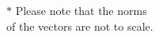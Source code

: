\documentclass[preview]{standalone}
\begin{document}
\begin{center}
$*$ Please note that the norms \\ of the vectors are not to scale.
\end{center}
\end{document}
